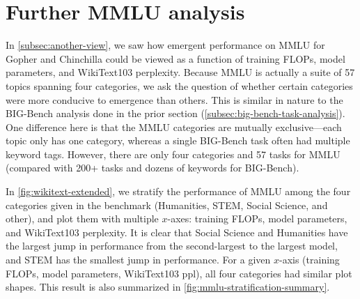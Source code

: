 \clearpage
\section{Further MMLU analysis}\label{sec:mmlu-analysis}

In \cref{subsec:another-view}, we saw how emergent performance on MMLU for Gopher and Chinchilla could be viewed as a function of training FLOPs, model parameters, and WikiText103 perplexity.
Because MMLU is actually a suite of 57 topics spanning four categories, we ask the question of whether certain categories were more conducive to emergence than others.
This is similar in nature to the BIG-Bench analysis done in the prior section (\cref{subsec:big-bench-task-analysis}).
One difference here is that the MMLU categories are mutually exclusive---each topic only has one category, whereas a single BIG-Bench task often had multiple keyword tags.
However, there are only four categories and 57 tasks for MMLU (compared with 200+ tasks and dozens of keywords for BIG-Bench). 

In \cref{fig:wikitext-extended}, we stratify the performance of MMLU among the four categories given in the benchmark (Humanities, STEM, Social Science, and other), and plot them with multiple $x$-axes: training FLOPs, model parameters, and WikiText103 perplexity.
It is clear that Social Science and Humanities have the largest jump in performance from the second-largest to the largest model, and STEM has the smallest jump in performance.
For a given $x$-axis (training FLOPs, model parameters, WikiText103 ppl), all four categories had similar plot shapes.
This result is also summarized in \cref{fig:mmlu-stratification-summary}.


